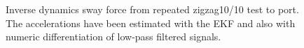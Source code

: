 \begin{figure}[h]
    \centering
    
    \caption{Inverse dynamics sway force from repeated zigzag10/10 test to port. The accelerations have been estimated with the EKF and also with numeric differentiation of low-pass filtered signals.}
    \label{fig:lowpass_deviation_points}
\end{figure}



%         
%         

